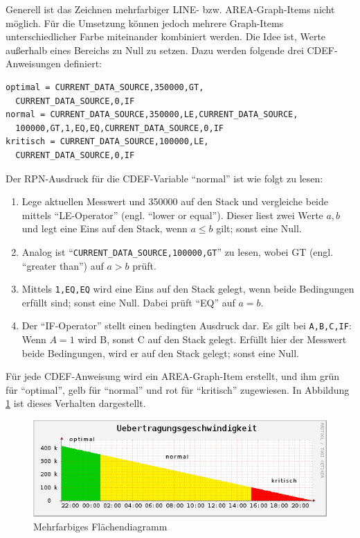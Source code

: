 \documentclass[12pt,ngerman,toc=listofnumbered,toc=bibliographynumbered,toc=index,headsepline=true]{scrbook}
\begin{document}
Generell ist das Zeichnen mehrfarbiger LINE- bzw. AREA-Graph-Items nicht
möglich. Für die Umsetzung können jedoch mehrere Graph-Items
unterschiedlicher Farbe miteinander kombiniert werden. Die Idee ist, Werte
außerhalb eines Bereichs zu Null zu setzen. Dazu werden folgende drei
CDEF-Anweisungen definiert:
\begin{lstlisting}[xleftmargin=20pt]
optimal = CURRENT_DATA_SOURCE,350000,GT,
  CURRENT_DATA_SOURCE,0,IF
normal = CURRENT_DATA_SOURCE,350000,LE,CURRENT_DATA_SOURCE,
  100000,GT,1,EQ,EQ,CURRENT_DATA_SOURCE,0,IF
kritisch = CURRENT_DATA_SOURCE,100000,LE,
  CURRENT_DATA_SOURCE,0,IF
\end{lstlisting}
Der RPN-Ausdruck für die CDEF-Variable \enquote{normal} ist wie folgt zu lesen:
\begin{enumerate}
  \item Lege aktuellen Messwert und 350000 auf den Stack und vergleiche beide
  mittels \enquote{LE-Operator} (engl. \enquote{lower or equal}). Dieser liest
  zwei Werte $a,b$ und legt eine Eins auf den Stack, wenn $a \leq b$ gilt; sonst
  eine Null.
  \item Analog ist \enquote{\texttt{CURRENT\_DATA\_SOURCE,100000,GT}} zu lesen,
  wobei GT (engl. \enquote{greater than}) auf $a>b$ prüft.
  \item Mittels \texttt{1,EQ,EQ} wird eine Eins auf den Stack gelegt, wenn beide
  Bedingungen erfüllt sind; sonst eine Null. Dabei prüft \enquote{EQ} auf $a=b$.
  \item Der \enquote{IF-Operator} stellt einen bedingten Ausdruck dar. Es gilt
  bei \texttt{A,B,C,IF}: Wenn $A = 1$ wird B, sonst C auf den Stack gelegt.
  Erfüllt hier der Messwert beide Bedingungen, wird er auf den Stack gelegt;
  sonst eine Null.
\end{enumerate}
Für jede CDEF-Anweisung wird ein AREA-Graph-Item erstellt, und ihm grün für
\enquote{optimal}, gelb für \enquote{normal} und rot für \enquote{kritisch}
zugewiesen. In Abbildung \ref{fig:cdef} ist dieses Verhalten dargestellt.

\begin{figure}
	\centering
	\includegraphics[scale=0.5]{bilder/cdef}
	\caption{Mehrfarbiges Flächendiagramm}
	\label{fig:cdef}
\end{figure}
\end{document}
